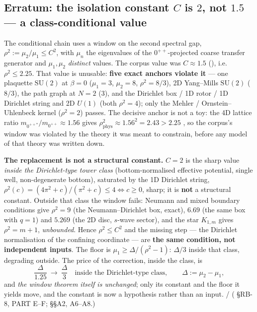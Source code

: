 \subsection{Erratum: the isolation constant $C$ is $2$, not $1.5$ --- a class-conditional value}
\label{app:erratum-C}

The conditional chain uses a window on the second spectral gap,
$\rho^2:=\mu_2/\mu_1\le C^2$, with $\mu_n$ the eigenvalues of the $0^{++}$-projected coarse
transfer generator and $\mu_1,\mu_2$ \emph{distinct} values. The corpus value was $C\approx1.5$
(), i.e.\ $\rho^2\le2.25$. \LT{} That value is unusable: \textbf{five exact anchors
violate it} --- one plaquette $\mathrm{SU}(2)$ at $\beta=0$ ($\mu_1=3$, $\mu_2=8$, $\rho^2=8/3$),
2D Yang--Mills $\mathrm{SU}(2)$ ($8/3$), the path graph at $N=2$ ($3$), and the Dirichlet box /
1D rotor / 1D Dirichlet string and 2D $U(1)$ (both $\rho^2=4$); only the Mehler /
Ornstein--Uhlenbeck kernel
($\rho^2=2$) passes. The decisive anchor is not a toy: the 4D lattice ratio
$m_{0^{++*}}/m_{0^{++}}\approx1.56$ gives
$\rho^2_{\mathrm{phys}}\approx1.56^2=2.43>2.25$ \LE, so the corpus's window was violated by the
theory it was meant to constrain, before any model of that theory was written down.

\textbf{The replacement is not a structural constant.} \LC{} $C=2$ is the sharp value \emph{inside
the Dirichlet-type tower class} (bottom-normalised effective potential, single well, non-degenerate
bottom), saturated by the 1D Dirichlet string,
$\rho^2(c)=(4\pi^2+c)/(\pi^2+c)\le4\iff c\ge0$, sharp; it is \textbf{not} a structural constant.
Outside that class the window fails: Neumann and mixed boundary conditions give $\rho^2=9$ (the
Neumann--Dirichlet box, exact), $6.69$ (the same box with $q=1$) and $5.269$ (the 2D disc, $s$-wave
sector), and the star $K_{1,m}$ gives $\rho^2=m+1$, \emph{unbounded}. Hence $\rho^2\le C^2$ and the
missing step --- the Dirichlet normalisation of the confining coordinate --- are \textbf{the same
condition, not independent inputs}. The floor is $\mu_1\ge\Delta/(\rho^2-1)$: $\Delta/3$ inside
that class, degrading outside. The price of the correction, inside the class, is
\[
  \frac{\Delta}{1.25}\ \longrightarrow\ \frac{\Delta}{3}
  \quad\text{inside the Dirichlet-type class},
  \qquad \Delta:=\mu_2-\mu_1 ,
\]
and \emph{the window theorem itself is unchanged}; only its constant and the floor it yields move,
and the constant is now a hypothesis rather than an input. \LM/\LE{}
( \S RB-8, PART E--F;
 \S\S A2, A6--A8.)

